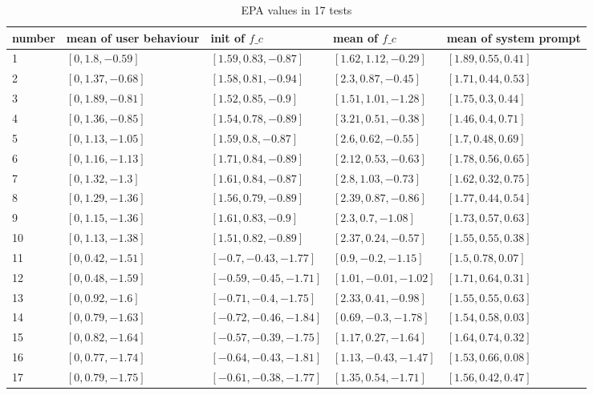 %
\begin{table}\small
\centering
\caption{EPA values in 17 tests}
\label{table:compare-epa-all}
\begin{tabular}{|  p{1.2cm} | p{2.6cm} |  p{3.5cm} |  p{3.4cm} |  p{3.0cm} |}
\hline
number & mean of user behaviour & init of $f\_c$ & mean of $f\_c$ & mean of system prompt \\ \hline
1 & $[0, 1.8, -0.59]$ & $[1.59, 0.83, -0.87]$ & $[1.62, 1.12, -0.29]$ & $[1.89, 0.55, 0.41]$ \\ \hline
2 & $[0, 1.37, -0.68]$ & $[1.58, 0.81, -0.94]$ & $[2.3, 0.87, -0.45]$ & $[1.71, 0.44, 0.53]$ \\ \hline
3 & $[0, 1.89, -0.81]$ & $[1.52, 0.85, -0.9]$ & $[1.51, 1.01, -1.28]$ & $[1.75, 0.3, 0.44]$ \\ \hline
4 & $[0, 1.36, -0.85]$ & $[1.54, 0.78, -0.89]$ & $[3.21, 0.51, -0.38]$ & $[1.46, 0.4, 0.71]$ \\ \hline
5 & $[0, 1.13, -1.05]$ & $[1.59, 0.8, -0.87]$ & $[2.6, 0.62, -0.55]$ & $[1.7, 0.48, 0.69]$ \\ \hline
6 & $[0, 1.16, -1.13]$ & $[1.71, 0.84, -0.89]$ & $[2.12, 0.53, -0.63]$ & $[1.78, 0.56, 0.65]$ \\ \hline
7 & $[0, 1.32, -1.3]$ & $[1.61, 0.84, -0.87]$ & $[2.8, 1.03, -0.73]$ & $[1.62, 0.32, 0.75]$ \\ \hline
8 & $[0, 1.29, -1.36]$ & $[1.56, 0.79, -0.89]$ & $[2.39, 0.87, -0.86]$ & $[1.77, 0.44, 0.54]$ \\ \hline
9 & $[0, 1.15, -1.36]$ & $[1.61, 0.83, -0.9]$ & $[2.3, 0.7, -1.08]$ & $[1.73, 0.57, 0.63]$ \\ \hline
10 & $[0, 1.13, -1.38]$ & $[1.51, 0.82, -0.89]$ & $[2.37, 0.24, -0.57]$ & $[1.55, 0.55, 0.38]$ \\ \hline
11 & $[0, 0.42, -1.51]$ & $[-0.7, -0.43, -1.77]$ & $[0.9, -0.2, -1.15]$ & $[1.5, 0.78, 0.07]$ \\ \hline
12 & $[0, 0.48, -1.59]$ & $[-0.59, -0.45, -1.71]$ & $[1.01, -0.01, -1.02]$ & $[1.71, 0.64, 0.31]$ \\ \hline
13 & $[0, 0.92, -1.6]$ & $[-0.71, -0.4, -1.75]$ & $[2.33, 0.41, -0.98]$ & $[1.55, 0.55, 0.63]$ \\ \hline
14 & $[0, 0.79, -1.63]$ & $[-0.72, -0.46, -1.84]$ & $[0.69, -0.3, -1.78]$ & $[1.54, 0.58, 0.03]$ \\ \hline
15 & $[0, 0.82, -1.64]$ & $[-0.57, -0.39, -1.75]$ & $[1.17, 0.27, -1.64]$ & $[1.64, 0.74, 0.32]$ \\ \hline
16 & $[0, 0.77, -1.74]$ & $[-0.64, -0.43, -1.81]$ & $[1.13, -0.43, -1.47]$ & $[1.53, 0.66, 0.08]$ \\ \hline
17 & $[0, 0.79, -1.75]$ & $[-0.61, -0.38, -1.77]$ & $[1.35, 0.54, -1.71]$ & $[1.56, 0.42, 0.47]$ \\ \hline
\end{tabular}
\end{table}
